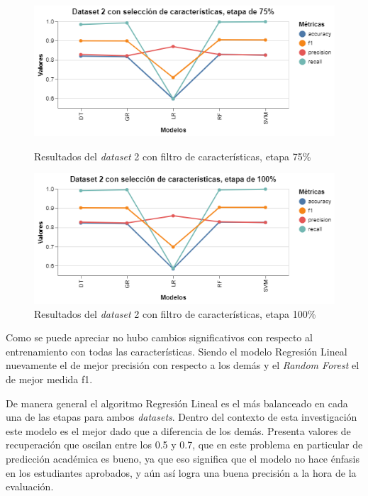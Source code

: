 \begin{figure}[htbp]
    \centering
    \begin{minipage}[t]{0.50\textwidth}
        \centering
        \includegraphics[width = \textwidth]{Graphics/dataset_2_fs_75.png}
        \caption{Resultados del \textit{dataset} 2 con filtro de características, etapa 75\%}
        \label{dataset2_fs_75}
    \end{minipage}\hfill
    \begin{minipage}[t]{0.50\textwidth}
        \centering
        \includegraphics[width = \textwidth]{Graphics/dataset_2_fs_100.png}
        \caption{Resultados del \textit{dataset} 2 con filtro de características, etapa 100\%}
        \label{dataset2_fs_100}
    \end{minipage}
\end{figure}

Como se puede apreciar no hubo cambios significativos con respecto al entrenamiento con todas las características.  Siendo el modelo Regresión Lineal nuevamente el de mejor precisión con respecto a los demás y el \textit{Random Forest} el de mejor medida f1. 

De manera general el algoritmo Regresión Lineal es el más balanceado en cada una de las etapas para ambos \textit{datasets}. Dentro del contexto de esta investigación este modelo es el mejor dado que a diferencia de los demás. 
Presenta valores de recuperación que oscilan entre los 0.5 y 0.7, que en este problema en 
particular de predicción académica es bueno, ya que eso significa que el modelo no hace énfasis en los estudiantes aprobados, y aún así logra una buena precisión a la hora de la evaluación. 


